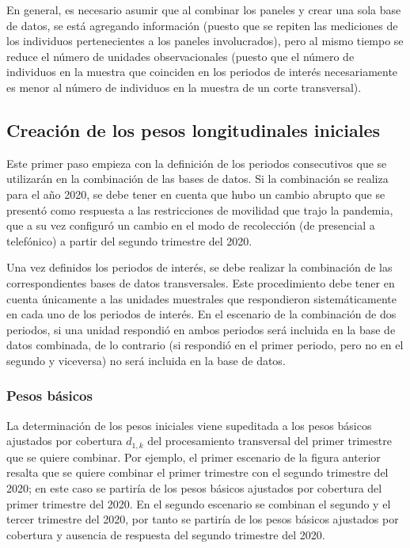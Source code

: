 \documentclass[
  12pt,
]{book}
\begin{document}
En general, es necesario asumir que al combinar los paneles y crear una sola base de datos, se está agregando información (puesto que se repiten las mediciones de los individuos pertenecientes a los paneles involucrados), pero al mismo tiempo se reduce el número de unidades observacionales (puesto que el número de individuos en la muestra que coinciden en los periodos de interés necesariamente es menor al número de individuos en la muestra de un corte transversal).

\hypertarget{creaciuxf3n-de-los-pesos-longitudinales-iniciales}{%
\subsection{Creación de los pesos longitudinales iniciales}\label{creaciuxf3n-de-los-pesos-longitudinales-iniciales}}

Este primer paso empieza con la definición de los periodos consecutivos que se utilizarán en la combinación de las bases de datos. Si la combinación se realiza para el año 2020, se debe tener en cuenta que hubo un cambio abrupto que se presentó como respuesta a las restricciones de movilidad que trajo la pandemia, que a su vez configuró un cambio en el modo de recolección (de presencial a telefónico) a partir del segundo trimestre del 2020.

Una vez definidos los periodos de interés, se debe realizar la combinación de las correspondientes bases de datos transversales. Este procedimiento debe tener en cuenta únicamente a las unidades muestrales que respondieron sistemáticamente en cada uno de los periodos de interés. En el escenario de la combinación de dos periodos, si una unidad respondió en ambos periodos será incluida en la base de datos combinada, de lo contrario (si respondió en el primer periodo, pero no en el segundo y viceversa) no será incluida en la base de datos.

\hypertarget{pesos-buxe1sicos}{%
\subsubsection{Pesos básicos}\label{pesos-buxe1sicos}}

La determinación de los pesos iniciales viene supeditada a los pesos básicos ajustados por cobertura \(d_{1, k}\) del procesamiento transversal del primer trimestre que se quiere combinar. Por ejemplo, el primer escenario de la figura anterior resalta que se quiere combinar el primer trimestre con el segundo trimestre del 2020; en este caso se partiría de los pesos básicos ajustados por cobertura del primer trimestre del 2020. En el segundo escenario se combinan el segundo y el tercer trimestre del 2020, por tanto se partiría de los pesos básicos ajustados por cobertura y ausencia de respuesta del segundo trimestre del 2020.
\end{document}
